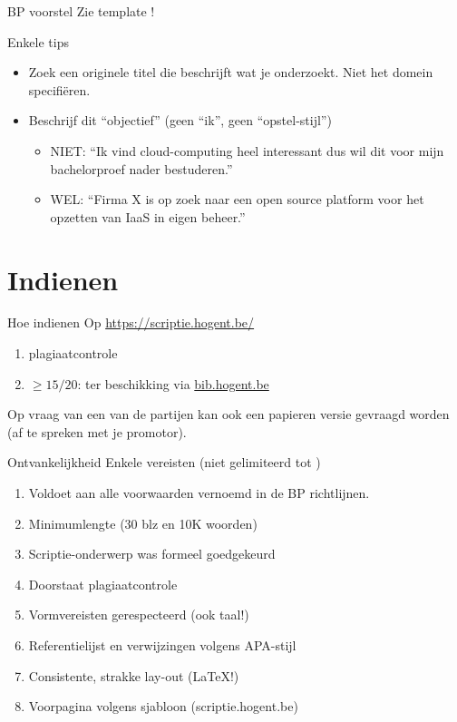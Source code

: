 \documentclass{beamer}
\begin{document}
\begin{frame}{BP voorstel}
	Zie template !
\end{frame}

\begin{frame}{Enkele tips}
	\begin{itemize}
		\item Zoek een originele titel die beschrijft wat je onderzoekt. Niet het domein specifi\"eren. 
		\item Beschrijf dit “objectief” (geen “ik”, geen “opstel-stijl”)
		\begin{itemize}
			\item \textcolor{HoGentAccent2}{NIET}: “Ik vind cloud-computing heel interessant dus wil dit voor mijn
			bachelorproef nader bestuderen.”
			\item \textcolor{HoGentAccent3}{WEL}: “Firma X is op zoek naar een open source platform voor het
			opzetten van IaaS in eigen beheer.”
		\end{itemize}
	\end{itemize}
\end{frame}

\section{Indienen}
\sectionframe{}
\begin{frame}{Hoe indienen}
	Op \href{https://scriptie.hogent.be/}{https://scriptie.hogent.be/}
	\begin{enumerate}
		\item plagiaatcontrole
		\item $\geq 15/20$: ter beschikking via \href{bib.hogent.be}{bib.hogent.be}
\end{enumerate}

Op vraag van een van de partijen kan ook een papieren versie gevraagd worden (af te spreken met je promotor). 

\end{frame}

\begin{frame}{Ontvankelijkheid}
	Enkele vereisten (niet gelimiteerd tot )
	\begin{enumerate}
		\item Voldoet aan alle voorwaarden vernoemd in de BP richtlijnen.
		\item Minimumlengte (30 blz en 10K woorden)
		\item Scriptie-onderwerp was formeel goedgekeurd
		\item Doorstaat plagiaatcontrole
		\item Vormvereisten gerespecteerd (ook taal!)
		\item Referentielijst en verwijzingen volgens APA-stijl
		\item Consistente, strakke lay-out (LaTeX!)
		\item Voorpagina volgens sjabloon (scriptie.hogent.be)
	\end{enumerate}
\end{frame}
\end{document}
